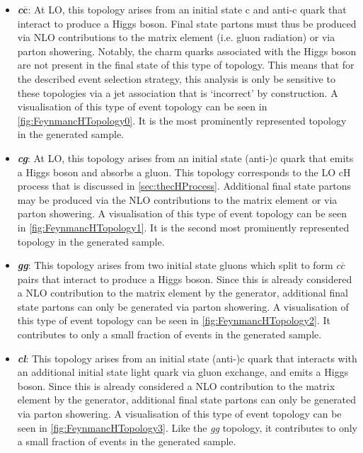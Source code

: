 \begin{itemize}
    \item \textit{\textbf{c$\overline{\bm{c}}$}}: At LO, this topology arises from an initial state c and anti-c quark that interact to produce a Higgs boson. Final state partons must thus be produced via NLO contributions to the matrix element (i.e. gluon radiation) or via parton showering. Notably, the charm quarks associated with the Higgs boson are not present in the final state of this type of topology. This means that for the described event selection strategy, this analysis is only be sensitive to these topologies via a jet association that is `incorrect' by construction. A visualisation of this type of event topology can be seen in \autoref{fig:FeynmancHTopology0}. It is the most prominently represented topology in the generated sample. 
    \item \textit{\textbf{cg}}: At LO, this topology arises from an initial state (anti-)c quark that emits a Higgs boson and absorbs a gluon. This topology corresponds to the LO cH process that is discussed in \autoref{sec:thecHProcess}. Additional final state partons may be produced via the NLO contributions to the matrix element or via parton showering. A visualisation of this type of event topology can be seen in \autoref{fig:FeynmancHTopology1}. It is the second most prominently represented topology in the generated sample. 
    \item \textit{\textbf{gg}}: This topology arises from two initial state gluons which split to form $c\overline{c}$ pairs that interact to produce a Higgs boson. Since this is already considered a NLO contribution to the matrix element by the generator, additional final state partons can only be generated via parton showering. A visualisation of this type of event topology can be seen in \autoref{fig:FeynmancHTopology2}. It contributes to only a small fraction of events in the generated sample.  
    \item \textit{\textbf{cl}}: This topology arises from an initial state (anti-)c quark that interacts with an additional initial state light quark via gluon exchange, and emits a Higgs boson. Since this is already considered a NLO contribution to the matrix element by the generator, additional final state partons can only be generated via parton showering. A visualisation of this type of event topology can be seen in \autoref{fig:FeynmancHTopology3}. Like the \textit{gg} topology, it contributes to only a small fraction of events in the generated sample.  
\end{itemize}
